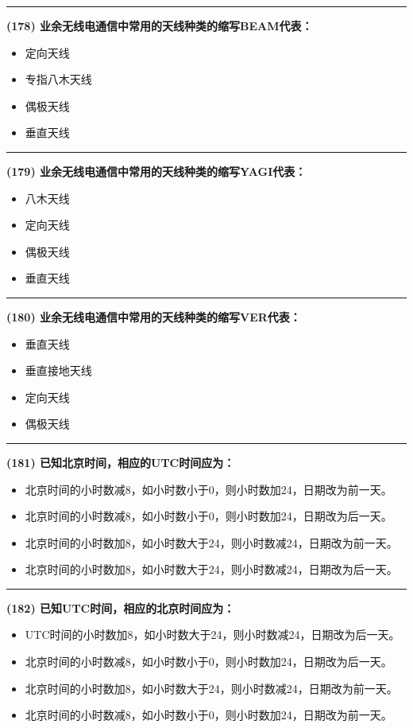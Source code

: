 \documentclass[twocolumn]{ctexart}  %
\begin{document}
\noindent\rule{0.5\textwidth}{1pt}
\heiti \textbf{(178) 业余无线电通信中常用的天线种类的缩写BEAM代表：} \songti {\color{gray} [LK0408] }
\begin{itemize}
	\item  定向天线
	\item  专指八木天线
	\item  偶极天线
	\item  垂直天线
\end{itemize}


\noindent\rule{0.5\textwidth}{1pt}
\heiti \textbf{(179) 业余无线电通信中常用的天线种类的缩写YAGI代表：} \songti {\color{gray} [LK0409] }
\begin{itemize}
	\item  八木天线
	\item  定向天线
	\item  偶极天线
	\item  垂直天线
\end{itemize}


\noindent\rule{0.5\textwidth}{1pt}
\heiti \textbf{(180) 业余无线电通信中常用的天线种类的缩写VER代表：} \songti {\color{gray} [LK0410] }
\begin{itemize}
	\item  垂直天线
	\item  垂直接地天线
	\item  定向天线
	\item  偶极天线
\end{itemize}


\noindent\rule{0.5\textwidth}{1pt}
\heiti \textbf{(181) 已知北京时间，相应的UTC时间应为：} \songti {\color{gray} [LK0193] }
\begin{itemize}
	\item  北京时间的小时数减8，如小时数小于0，则小时数加24，日期改为前一天。
	\item  北京时间的小时数减8，如小时数小于0，则小时数加24，日期改为后一天。
	\item  北京时间的小时数加8，如小时数大于24，则小时数减24，日期改为前一天。
	\item  北京时间的小时数加8，如小时数大于24，则小时数减24，日期改为后一天。
\end{itemize}


\noindent\rule{0.5\textwidth}{1pt}
\heiti \textbf{(182) 已知UTC时间，相应的北京时间应为：} \songti {\color{gray} [LK0194] }
\begin{itemize}
	\item  UTC时间的小时数加8，如小时数大于24，则小时数减24，日期改为后一天。
	\item  北京时间的小时数减8，如小时数小于0，则小时数加24，日期改为后一天。
	\item  北京时间的小时数加8，如小时数大于24，则小时数减24，日期改为前一天。
	\item  北京时间的小时数减8，如小时数小于0，则小时数加24，日期改为前一天。
\end{itemize}
\end{document}
